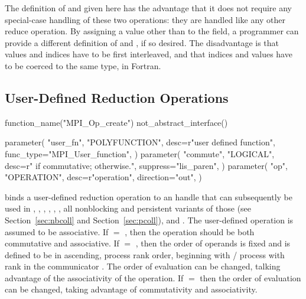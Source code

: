 \begin{rationale}
The definition of  and  given
here has the advantage that it does not require any special-case
handling of these two operations: they are handled like any other
reduce operation.  By assigning a value other than  to the  field, a programmer can provide a different definition
of  and , if so desired.
The disadvantage is that values and indices have to be first
interleaved, and that indices and values have to be coerced to the
same type, in Fortran.
\end{rationale}

\subsection{User-Defined Reduction Operations}
\label{subsec:coll-user-ops}

%
\begin{mpi-binding}
    function_name("MPI_Op_create")
    not_abstract_interface()

    parameter(
        "user_fn",
        "POLYFUNCTION",
        desc=r"user defined function",
        func_type="MPI_User_function",
    )
    parameter(
        "commute",
        "LOGICAL",
        desc=r" if commutative;  otherwise.",
        suppress="lis_paren",
    )
    parameter(
        "op", "OPERATION", desc=r"operation", direction="out",
    )
\end{mpi-binding}

 binds a user-defined reduction operation
to an  handle that can subsequently be used in
, ,
,
,
, , all nonblocking and persistent variants of
those (see Section~\ref{sec:nbcoll} and Section~\ref{sec:pcoll}), and .
The user-defined operation is assumed to be associative.
If  $=$ , then the operation should be both
commutative and associative. If   $=$ ,
then the order of operands is fixed and is defined to be in ascending, process
rank order, beginning with \MPI/ process with rank  in the communicator .  The order of evaluation can be
changed, talking advantage of the associativity of the operation.  If
 $=$  then the order of evaluation can be changed,
taking advantage of commutativity and associativity.

